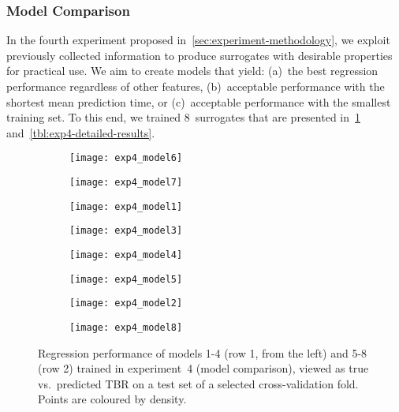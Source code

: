 \subsubsection{Model Comparison}

In the fourth experiment proposed
in~\cref{sec:experiment-methodology}, we exploit previously collected information
to produce surrogates with desirable properties for practical use. We
aim to create models that yield: (a)~the best regression performance regardless
of other features, (b)~acceptable performance with the shortest mean
prediction time, or (c)~acceptable performance with the smallest training set.
To this end, we trained 8~surrogates that are presented in~\cref{fig:reg-performance}
and~\cref{tbl:exp4-detailed-results}.

\begin{figure}[h]
	\centering
	\begin{subfigure}[b]{0.25\textwidth}
		\centering
		\texttt{[image: exp4\_model6]}
	\end{subfigure}\hfill%
	\begin{subfigure}[b]{0.25\textwidth}
		\centering
		\texttt{[image: exp4\_model7]}
	\end{subfigure}\hfill%
	\begin{subfigure}[b]{0.25\textwidth}
		\centering
		\texttt{[image: exp4\_model1]}
	\end{subfigure}\hfill%
	\begin{subfigure}[b]{0.25\textwidth}
		\centering
		\texttt{[image: exp4\_model3]}
	\end{subfigure}

	\begin{subfigure}[b]{0.25\textwidth}
		\centering
		\texttt{[image: exp4\_model4]}
	\end{subfigure}\hfill%
	\begin{subfigure}[b]{0.25\textwidth}
		\centering
		\texttt{[image: exp4\_model5]}
	\end{subfigure}\hfill%
	\begin{subfigure}[b]{0.25\textwidth}
		\centering
		\texttt{[image: exp4\_model2]}
	\end{subfigure}\hfill%
	\begin{subfigure}[b]{0.25\textwidth}
		\centering
		\texttt{[image: exp4\_model8]}
	\end{subfigure}
	\caption{Regression performance of models 1-4 (row 1, from the left) and 5-8
		(row 2) trained in experiment~4 (model comparison), viewed
		as true vs.~predicted TBR on a test set of a selected cross-validation
		fold. Points are coloured by density.}
	\label{fig:reg-performance}
\end{figure}

